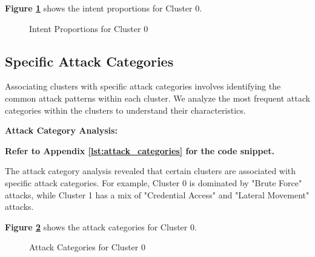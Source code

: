         \textbf{Figure \ref{fig:intent-proportions}} shows the intent proportions for Cluster 0.

        \begin{figure}[h]
            \centering
            \caption{Intent Proportions for Cluster 0}
            \label{fig:intent-proportions}
        \end{figure}
        
    \subsection{Specific Attack Categories}
    
        Associating clusters with specific attack categories involves identifying the common attack patterns within each cluster. We analyze the most frequent attack categories within the clusters to understand their characteristics.

        \textbf{Attack Category Analysis:}
        
        \vspace{0.5em}

        \textbf{Refer to Appendix \ref{lst:attack_categories} for the code snippet.}

        The attack category analysis revealed that certain clusters are associated with specific attack categories. For example, Cluster 0 is dominated by "Brute Force" attacks, while Cluster 1 has a mix of "Credential Access" and "Lateral Movement" attacks.

        \textbf{Figure \ref{fig:attack-categories}} shows the attack categories for Cluster 0.

        \begin{figure}[h]
            \centering
            \caption{Attack Categories for Cluster 0}
            \label{fig:attack-categories}
        \end{figure}
        